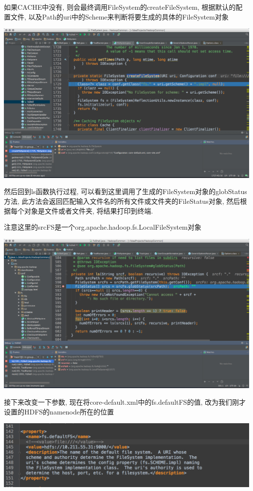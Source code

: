 如果CACHE中没有, 则会最终调用FileSystem的createFileSystem, 根据默认的配置文件,
以及Path的uri中的Scheme来判断将要生成的具体的FileSystem对象

\includegraphics[width=\textwidth]{image/env/cr39.png}

然后回到ls函数执行过程, 可以看到这里调用了生成的FileSystem对象的globStatus方法,
此方法会返回匹配输入文件名的所有文件或文件夹的FileStatus对象, 然后根据每个对象是文件或者文件夹,
将结果打印到终端.

注意这里的srcFS是一个org.apache.hadoop.fs.LocalFileSystem对象

\includegraphics[width=\textwidth]{image/env/cr40.png}

接下来改变一下参数, 现在将core-default.xml中的fs.defaultFS的值,
改为我们刚才设置的HDFS的namenode所在的位置

\includegraphics[width=\textwidth]{image/env/cr41.png}

